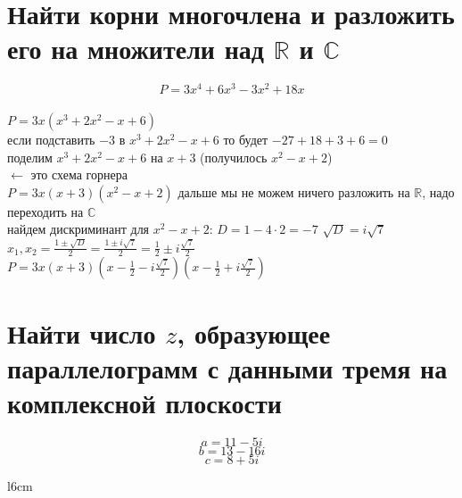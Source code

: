 \documentclass{article}
\newcommand{\ds}{\displaystyle}
\begin{document}
  \section{Найти корни многочлена и разложить его на множители над $\mathbb{R}$ и $\mathbb{C}$}
  \[
    P = 3x^4 + 6x^3 - 3x^2 + 18x
  \] \\
  $\ds P = 3x(x^3 + 2x^2 - x + 6)$ \\
  если подставить $-3$ в $x^3 + 2x^2 - x + 6$ то будет $-27 + 18 + 3 + 6 = 0$ \\
  поделим $x^3 + 2x^2 - x + 6$ на $x+3$ (получилось $x^2-x+2$) \\
   \qquad $\leftarrow$ это схема горнера\\
  $\ds P = 3x(x+3)(x^2-x+2)$ дальше мы не можем ничего разложить на $\mathbb{R}$, надо переходить на $\mathbb{C}$ \\
  найдем дискриминант для $x^2-x+2$: \quad $\ds D = 1-4 \cdot 2 = -7$ \quad $\sqrt{D} = i\sqrt{7}$ \\
  $\ds x_1,x_2 = \frac{1\pm\sqrt{D}}{2} = \frac{1\pm i\sqrt{7}}{2} = \frac{1}{2}\pm i\frac{\sqrt{7}}{2}$ \\
  $\ds P = 3x(x+3)
    \left(x-\frac{1}{2}-i\frac{\sqrt{7}}{2}\right)
    \left(x-\frac{1}{2}+i\frac{\sqrt{7}}{2}\right)
  $

  \section{Найти число $z$, образующее параллелограмм с данными тремя на комплексной плоскости}
  $$ a = 11-5i $$
  $$ b = 13-16i $$
  $$ c = 8+5i $$
  \begin{wrapfigure}{l}{6cm}
    \vspace{-2.5cm}
    \centering
    \vspace{-.5cm}
  \end{wrapfigure}
\end{document}
